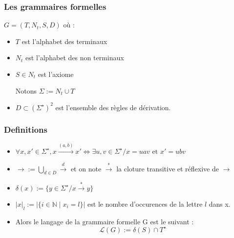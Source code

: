\documentclass[12pt]{beamer}
\title{\letitle}
\author{\leauthor}
\date{}
\newcommand{\norm}[1]{\lvert #1 \rvert}
\begin{document}
\begin{frame}
\titlepage
\end{frame}
    \begin{frame}\frametitle{Les grammaires formelles}

$G = (T,N_t,S,D)$ où :
\begin{itemize}
\item $T$ est l'alphabet des terminaux
\item $N_t$ est l'alphabet des non terminaux
\item $S \in N_t$ est l'axiome

Notons $\Sigma := N_t \cup T$
\item $D \subset (\Sigma ^ \star )^2$ est l'ensemble des règles de dérivation.
\end{itemize}
\end{frame}

\begin{frame}\frametitle{Definitions}
\begin{itemize}
\item $\forall x,x' \in \Sigma^\star, x \overset{(a,b)}{\rightarrow} x' \iff \exists u,v \in \Sigma^\star / x = uav \text{ et } x' = ubv$

\item $\rightarrow := \bigcup_{d \in D} \overset{d}{\rightarrow}$ et on note $\overset{*}{\rightarrow}$ la cloture transitive et réflexive de $\rightarrow$

\item $\delta(x) := \{y \in \Sigma^\star / x \overset{*}{\rightarrow} y\}$

\item $\norm{x}_l := \norm{\{i \in \mathbb{N} \mid x_i = l \}}$ est le nombre d'occurences de la lettre $l$ dans x.

\item Alors le langage de la grammaire formelle  G est le suivant :
\begin{equation*}\mathcal{L} (G) := \delta(S) \cap T^\star\end{equation*}
\end{itemize}
\end{frame}
\end{document}
